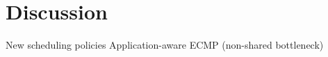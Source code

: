 \section{Discussion}\label{s:discussion}

\begin{outline}
\1 New scheduling policies
    \2 Application-aware
\1 ECMP (non-shared bottleneck)
\end{outline}
